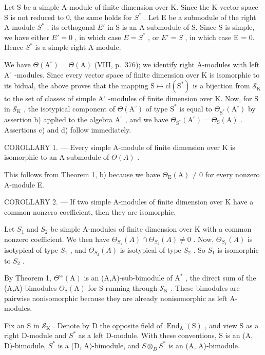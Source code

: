 Let S be a simple A-module of finite dimension over K. Since the K-vector space S is not reduced to 0, the same holds for \(S^{*}\) . Let E be a submodule of the right A-module \(S^{*}\) ; its orthogonal \(E'\) in S is an A-submodule of S. Since S is simple, we have either \(E' = 0\) , in which case \(E = S^{*}\) , or \(E' = S\) , in which case E = 0. Hence \(S^{*}\) is a simple right A-module.

We have \(\Theta (\mathrm{A}^{\circ}) = \Theta (\mathrm{A})\) (VIII, p.~376); we identify right A-modules with left \(\mathrm{A}^{\circ}\) -modules. Since every vector space of finite dimension over K is isomorphic to its bidual, the above proves that the mapping \(\mathrm{S}\mapsto \mathrm{cl}(\mathrm{S}^{*})\) is a bijection from \(\mathcal{S}_{\mathrm{K}}\) to the set of classes of simple \(\mathrm{A}^{\circ}\) -modules of finite dimension over K. Now, for S in \(\mathcal{S}_{\mathrm{K}}\) , the isotypical component of \(\Theta (\mathrm{A}^{\circ})\) of type \(\mathrm{S}^*\) is equal to \(\Theta_{\mathrm{S}^*}(\mathrm{A}^{\circ})\) by assertion b) applied to the algebra \(\mathrm{A}^{\circ}\) , and we have \(\Theta_{\mathrm{S}^*}(\mathrm{A}^{\circ}) = \Theta_{\mathrm{S}}(\mathrm{A})\) . Assertions c) and d) follow immediately.

COROLLARY 1. --- Every simple A-module of finite dimension over K is isomorphic to an A-submodule of \(\Theta(A)\) .

This follows from Theorem 1, b) because we have \(\Theta_{\mathrm{E}}(\mathrm{A}) \neq 0\) for every nonzero A-module E.

COROLLARY 2. --- If two simple A-modules of finite dimension over K have a common nonzero coefficient, then they are isomorphic.

Let \(S_{1}\) and \(S_{2}\) be simple A-modules of finite dimension over K with a common nonzero coefficient. We then have \(\Theta_{S_{1}}(A) \cap \Theta_{S_{2}}(A) \neq 0\) . Now, \(\Theta_{S_{1}}(A)\) is isotypical of type \(S_{1}\) , and \(\Theta_{S_{2}}(A)\) is isotypical of type \(S_{2}\) . So \(S_{1}\) is isomorphic to \(S_{2}\) .

By Theorem 1, \(\Theta^{\mathrm{ss}}(\mathrm{A})\) is an (A,A)-sub-bimodule of \(\mathrm{A}^*\) , the direct sum of the (A,A)-bimodules \(\Theta_{\mathrm{S}}(\mathrm{A})\) for S running through \(\mathcal{S}_{\mathrm{K}}\) . These bimodules are pairwise nonisomorphic because they are already nonisomorphic as left A-modules.

Fix an S in \(\mathcal{S}_{\mathrm{K}}\) . Denote by D the opposite field of \(\operatorname{End}_{\mathrm{A}}(\mathrm{S})\) , and view S as a right D-module and \(S^{*}\) as a left D-module. With these conventions, S is an (A, D)-bimodule, \(S^{*}\) is a (D, A)-bimodule, and \(S \otimes_{D} S^{*}\) is an (A, A)-bimodule.

